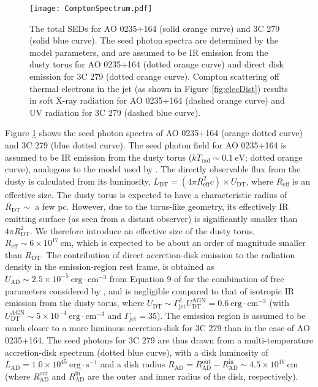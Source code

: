 \documentclass[twocolumn, tighten, twocolappendix]{aastex63}
\begin{document}
\begin{figure}[ht!]
\texttt{[image: ComptonSpectrum.pdf]}
\caption{The total SEDs for AO 0235+164 (solid orange curve) and 3C 279 (solid blue curve). The seed photon spectra are determined by the model parameters, and are assumed to be IR emission from the dusty torus for AO 0235+164 (dotted orange curve) and direct disk emission for 3C 279 (dotted orange curve). Compton scattering off thermal electrons in the jet (as shown in Figure \ref{fig:elecDist}) results in soft X-ray radiation for AO 0235+164 (dashed orange curve) and UV radiation for 3C 279 (dashed blue curve). \label{fig:ComptonSpectra}}
\end{figure}
Figure \ref{fig:ComptonSpectra} shows the seed photon spectra of AO 0235+164 (orange dotted curve) and 3C 279 (blue dotted curve). The seed photon field for AO 0235+164 is assumed to be IR emission from the dusty torus ($kT_{\mathrm{rad}} \sim 0.1 ~\mathrm{eV}$; dotted orange curve), analogous to the model used by \cite{Baring_etal2017}. The directly observable flux from the dusty is calculated from its luminosity, $L_{\mathrm{DT}} = (4 \pi R_{\mathrm{eff}}^2 c)\times U_{\mathrm{DT}}$, where $R_{\mathrm{eff}}$ is an effective size. The dusty torus is expected to have a characteristic radius of $R_{\mathrm{DT}} \sim$ a few pc. However, due to the torus-like geometry, its effectively IR emitting surface (as seen from a distant observer) is significantly smaller than $4 \pi R_{\mathrm{DT}}^2$. We therefore introduce an effective size of the dusty torus, $R_{\mathrm{eff}} \sim 6\times10^{17}~\mathrm{cm}$, which is expected to be about an order of magnitude smaller than $R_{\mathrm{DT}}$. The contribution of direct accretion-disk emission to the radiation density in the emission-region rest frame, is obtained as $U_{\mathrm{AD}}\sim 2.5 \times 10^{-5} ~\mathrm{erg \cdot cm^{-3}}$ from Equation 9 of \cite{Ghisellini_Madau_1996} for the combination of free parameters considered by \cite{Baring_etal2017}, and is negligible compared to that of isotropic IR emission from the dusty torus, where $U_{\mathrm{DT}} \sim \Gamma_{\mathrm{jet}}^2U_{\mathrm{DT}}^{\mathrm{AGN}} = 0.6 ~\mathrm{erg \cdot cm^{-3}}$ (with $U_{\mathrm{DT}}^{\mathrm{AGN}} \sim 5 \times 10^{-4} ~\mathrm{erg \cdot cm^{-3}}$ and $\Gamma_{\mathrm{jet}} = 35$). The emission region is assumed to be much closer to a more luminous accretion-disk for 3C 279 than in the case of AO 0235+164. The seed photons for 3C 279 are thus drawn from a multi-temperature accretion-disk spectrum (dotted blue curve), with a disk luminosity of $L_{\mathrm{AD}} = 1.0 \times 10^{45} ~\mathrm{erg \cdot s^{-1}}$ and a disk radius $R_{\mathrm{AD}} = R_{\mathrm{AD}}^{\mathrm{out}} - R_{\mathrm{AD}}^{\mathrm{in}} \sim 4.5 \times 10^{16} ~\mathrm{cm}$ (where $R_{\mathrm{AD}}^{\mathrm{out}}$ and $R_{\mathrm{AD}}^{\mathrm{in}}$ are the outer and inner radius of the disk, respectively).
\end{document}
